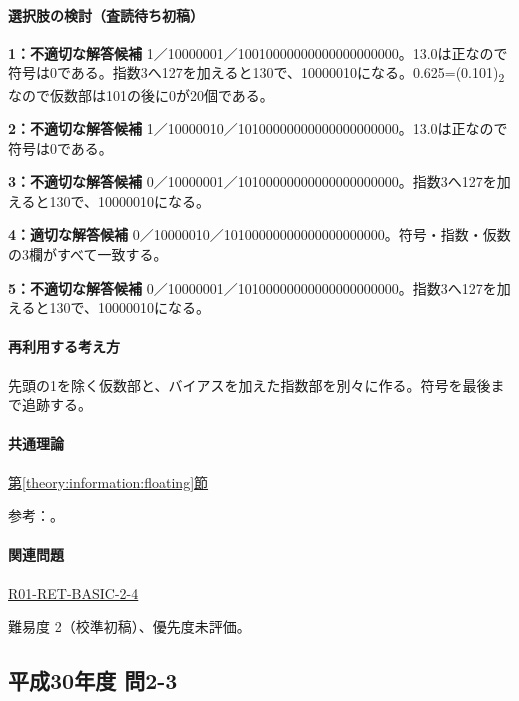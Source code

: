 \paragraph{選択肢の検討（査読待ち初稿）}\mbox{}\par

\noindent\textbf{1：不適切な解答候補} 1／10000001／10010000000000000000000。13.0は正なので符号は0である。指数3へ127を加えると130で、10000010になる。0.625=\allowbreak{}(0.101)\textsubscript{2}なので仮数部は101の後に0が20個である。\par

\noindent\textbf{2：不適切な解答候補} 1／10000010／10100000000000000000000。13.0は正なので符号は0である。\par

\noindent\textbf{3：不適切な解答候補} 0／10000001／10100000000000000000000。指数3へ127を加えると130で、10000010になる。\par

\noindent\textbf{4：適切な解答候補} 0／10000010／10100000000000000000000。符号・指数・仮数の3欄がすべて一致する。\par

\noindent\textbf{5：不適切な解答候補} 0／10000001／10100000000000000000000。指数3へ127を加えると130で、10000010になる。\par

\paragraph{再利用する考え方} 先頭の1を除く仮数部と、バイアスを加えた指数部を別々に作る。符号を最後まで追跡する。

\paragraph{共通理論} \hyperref[theory:information:floating]{第\ref*{theory:information:floating}節}

\par 参考：\cite{oracle_single}。

\paragraph{関連問題} \hyperref[q:r01-ret-basic-2-4]{R01-RET-BASIC-2-4}

\par 難易度 2（校準初稿）、優先度未評価。

\subsection{平成30年度 問2-3}
\label{q:h30-reg-basic-2-3}

